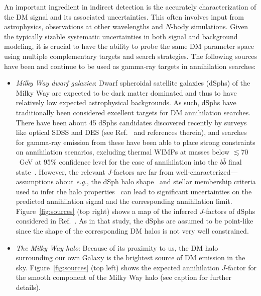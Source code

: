 An important ingredient in indirect detection is the accurately characterization of the DM signal and its associated uncertainties. This often involves input from astrophysics, observations at other wavelengths and $N$-body simulations. Given the typically sizable systematic uncertainties in both signal and background modeling, it is crucial to have the ability to probe the same DM parameter space using multiple complementary targets and search strategies. The following sources have been and continue to be used as gamma-ray targets in annihilation searches:  %
\begin{itemize}
\item \emph{Milky Way dwarf galaxies}: Dwarf spheroidal satellite galaxies (dSphs) of the Milky Way are expected to be dark matter dominated and thus to have relatively low expected astrophysical backgrounds. As such, dSphs have traditionally been considered excellent targets for DM annihilation searches. There have been about 45 dSphs candidates discovered recently by surveys like optical SDSS and DES (see Ref.~\cite{Fermi-LAT:2016uux} and references therein), and searches for gamma-ray emission from these have been able to place strong constraints on annihilation scenarios, excluding thermal WIMPs at masses below $\lesssim 70$~GeV at 95\% confidence level for the case of annihilation into  the $b\bar b$ final state~\cite{Fermi-LAT:2016uux,Ackermann:2015zua}. However, the relevant $J$-factors are far from well-characterized---assumptions about \emph{e.g.}, the dSph halo shape~\cite{Geringer-Sameth:2014qqa,Sanders:2016eie} and stellar membership criteria used to infer the halo properties~\cite{2016MNRAS.462..223B,Geringer-Sameth:2014yza} can lead to significant uncertainties on the predicted annihilation signal and the corresponding annihilation limit. Figure~\ref{fig:sources} (top right) shows a map of the inferred $J$-factors of dSphs considered in Ref.~\cite{Fermi-LAT:2016uux}. As in that study, the dSphs are assumed to be point-like since the shape of the corresponding DM halos is not very well constrained.
\item \emph{The Milky Way halo}: Because of its proximity to us, the DM halo surrounding our own Galaxy is the brightest source of DM emission in the sky. Figure~\ref{fig:sources} (top left) shows the expected annihilation $J$-factor for the smooth component of the Milky Way halo (see caption for further details). 


\end{itemize}
